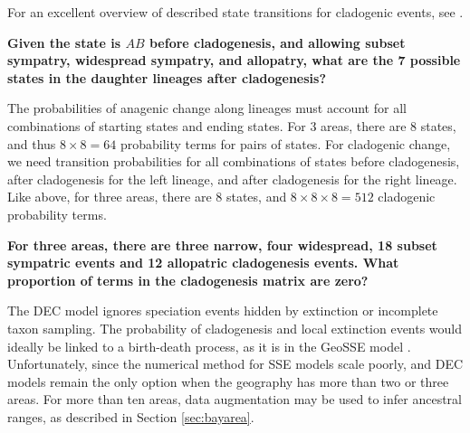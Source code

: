 For an excellent overview of described state transitions for cladogenic events, see \citet{matzke13}.

{\bf {} Given the state is $AB$ before cladogenesis, and allowing subset sympatry, widespread sympatry, and allopatry, what are the 7 possible states in the daughter lineages after cladogenesis?}

The probabilities of anagenic change along lineages must account for all combinations of starting states and ending states.
For 3 areas, there are 8 states, and thus $8 \times 8 = 64$ probability terms for pairs of states.
For cladogenic change, we need transition probabilities for all combinations of states before cladogenesis, after cladogenesis for the left lineage, and after cladogenesis for the right lineage.
Like above, for three areas, there are 8 states, and $8 \times 8 \times 8 = 512$ cladogenic probability terms.

{\bf {} For three areas, there are three narrow, four widespread, 18 subset sympatric events and 12 allopatric cladogenesis events. What proportion of terms in the cladogenesis matrix are zero?}

The DEC model ignores speciation events hidden by extinction or incomplete taxon sampling.
The probability of cladogenesis and local extinction events would ideally be linked to a birth-death process, as it is in the GeoSSE model \citep{goldberg11}.
Unfortunately, since the numerical method for SSE models scale poorly, and DEC models remain the only option when the geography has more than two or three areas.
For more than ten areas, data augmentation may be used to infer ancestral ranges, as described in Section \ref{sec:bayarea}.


